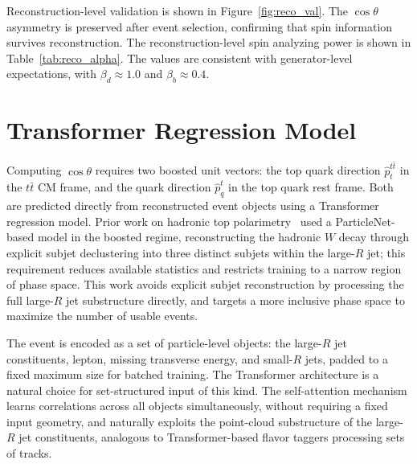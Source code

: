 \begin{table}[h]
	\centering
	\caption{Fitted spin analyzing power $\beta$ at reconstruction level.}
	\label{tab:reco_alpha}
\end{table}

Reconstruction-level validation is shown in Figure~\ref{fig:reco_val}.
The $\cos\theta$ asymmetry is preserved after event selection, confirming that spin information survives reconstruction. 
The reconstruction-level spin analyzing power is shown in Table~\ref{tab:reco_alpha}. 
The values are consistent with generator-level expectations, with $\beta_d \approx 1.0$ and $\beta_b \approx 0.4$.

\section{Transformer Regression Model}

Computing $\cos\theta$ requires two boosted unit vectors: the top quark direction $\hat{p}_t^{t\bar{t}}$ in the $t\bar{t}$ CM frame, and the quark direction $\hat{p}_q^t$ in the top quark rest frame. 
Both are predicted directly from reconstructed event objects using a Transformer regression model. 
Prior work on hadronic top polarimetry~\cite{Dong_2025} used a ParticleNet-based model in the boosted regime, reconstructing the hadronic $W$ decay through explicit subjet declustering into three distinct subjets within the large-$R$ jet; this requirement reduces available statistics and restricts training to a narrow region of phase space. 
This work avoids explicit subjet reconstruction by processing the full large-$R$ jet substructure directly, and targets a more inclusive phase space to maximize the number of usable events.

The event is encoded as a set of particle-level objects: the large-$R$ jet constituents, lepton, missing transverse energy, and small-$R$ jets, padded to a fixed maximum size for batched training. 
The Transformer architecture is a natural choice for set-structured input of this kind. 
The self-attention mechanism learns correlations across all objects simultaneously, without requiring a fixed input geometry, and naturally exploits the point-cloud substructure of the large-$R$ jet constituents, analogous to Transformer-based flavor taggers processing sets of tracks.


